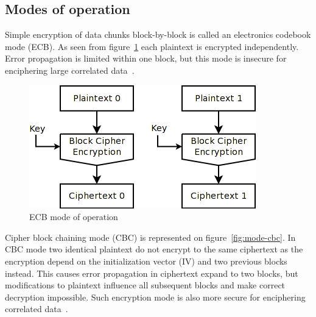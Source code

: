 \subsection{Modes of operation}

Simple encryption of data chunks block-by-block is called an electronics
codebook mode (ECB). As seen from figure~\ref{fig:mode-ecb} each plaintext is
encrypted independently. Error propagation is limited within one block, but
this mode is insecure for enciphering large correlated
data~\cite{menezes:applied_cryptography}.
\begin{figure}[htbp]
	\centering
	\includegraphics[scale=0.6]{images/modes_ecb}
	\caption{ECB mode of operation}
	\label{fig:mode-ecb}
\end{figure}

Cipher block chaining mode (CBC) is represented on figure~\ref{fig:mode-cbc}.
In CBC mode two identical plaintext do not encrypt to the same ciphertext as
the encryption depend on the initialization vector (IV) and two previous blocks
instead. This causes error propagation in ciphertext expand to two blocks, but
modifications to plaintext influence all subsequent blocks and make correct
decryption impossible. Such encryption mode is also more secure for enciphering
correlated data~\cite{menezes:applied_cryptography}.

